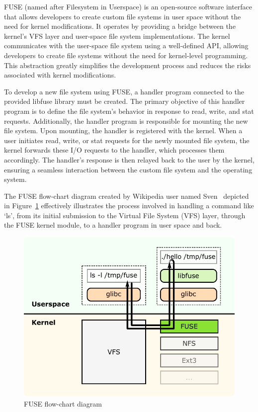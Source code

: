 FUSE (named after Filesystem in Userspace) is an open-source software interface that allows developers to create custom file systems in user space without the need for kernel modifications.
It operates by providing a bridge between the kernel's VFS layer and user-space file system implementations.
The kernel communicates with the user-space file system using a well-defined API, allowing developers to create file systems without the need for kernel-level programming.
This abstraction greatly simplifies the development process and reduces the risks associated with kernel modifications.

To develop a new file system using FUSE, a handler program connected to the provided libfuse library must be created.
The primary objective of this handler program is to define the file system's behavior in response to read, write, and stat requests.
Additionally, the handler program is responsible for mounting the new file system.
Upon mounting, the handler is registered with the kernel.
When a user initiates read, write, or stat requests for the newly mounted file system, the kernel forwards these I/O requests to the handler, which processes them accordingly.
The handler's response is then relayed back to the user by the kernel, ensuring a seamless interaction between the custom file system and the operating system.

The FUSE flow-chart diagram created by Wikipedia user named Sven~\cite{fuse-diagram} depicted in Figure~\ref{fig:fuse-diagram} effectively illustrates the process involved in handling a command like `ls', from its initial submission to the Virtual File System (VFS) layer, through the FUSE kernel module, to a handler program in user space and back.

\begin{figure}[ht]
    \centering
    \includegraphics[width=\linewidth]{img/fuse_diagram}
    \caption{FUSE flow-chart diagram}\label{fig:fuse-diagram}
\end{figure}

